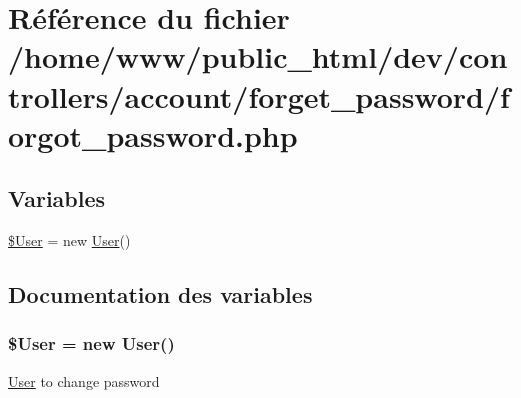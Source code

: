 \hypertarget{forgot__password_8php}{\section{Référence du fichier /home/www/public\-\_\-html/dev/controllers/account/forget\-\_\-password/forgot\-\_\-password.php}
\label{forgot__password_8php}
}
\subsection*{Variables}
\begin{DoxyCompactItemize}
\item 
\hyperlink{forgot__password_8php_a77cc6ebf3902e67557ab5de9317a11c2}{\$\-User} = new \hyperlink{class_user}{User}()
\end{DoxyCompactItemize}


\subsection{Documentation des variables}
\hypertarget{forgot__password_8php_a77cc6ebf3902e67557ab5de9317a11c2}{
\subsubsection[{\$\-User}]{\setlength{\rightskip}{0pt plus 5cm}\${\bf User} = new {\bf User}()}}\label{forgot__password_8php_a77cc6ebf3902e67557ab5de9317a11c2}
\hyperlink{class_user}{User} to change password 